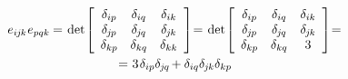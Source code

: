 \begin{otherlanguage}{russian}
\nopagebreak\vspace{-0.2em}\begin{equation*}\begin{array}{c}
e_{i\hspace{-0.1ex}j\hspace{-0.1ex}k} \hspace{.1ex} e_{pqk} \hspace{-0.1ex} = \hspace{.2ex}
\operatorname{det} \hspace{-0.25ex} \left[
\begin{array}{ccc}
\delta_{ip} & \delta_{iq} & \delta_{ik} \\
\delta_{\hspace{-0.1ex}j\hspace{-0.1ex}p} & \delta_{\hspace{-0.1ex}j\hspace{-0.1ex}q} & \delta_{\hspace{-0.1ex}j\hspace{-0.1ex}k} \\
\delta_{kp} & \delta_{kq} & \delta_{kk}
\end{array}
\right] \hspace{-0.5ex} = \hspace{.2ex}
\operatorname{det} \hspace{-0.25ex} \left[
\begin{array}{ccc}
\delta_{ip} & \delta_{iq} & \delta_{ik} \\
\delta_{\hspace{-0.1ex}j\hspace{-0.1ex}p} & \delta_{\hspace{-0.1ex}j\hspace{-0.1ex}q} & \delta_{\hspace{-0.1ex}j\hspace{-0.1ex}k} \\
\delta_{kp} & \delta_{kq} & 3
\end{array}
\right] \hspace{-0.5ex} =
\\[1.5em]
%
= \hspace{.1ex} 3 \hspace{.2ex} \delta_{ip} \delta_{\hspace{-0.1ex}j\hspace{-0.1ex}q} \hspace{-0.2ex}
+ \delta_{iq} \delta_{\hspace{-0.1ex}j\hspace{-0.1ex}k} \delta_{kp} \hspace{-0.2ex}

\end{array}
\end{equation*}
\end{otherlanguage}
